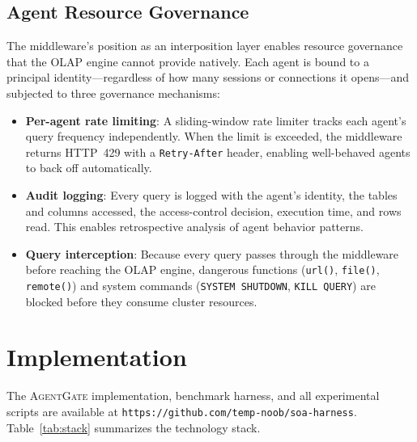 \documentclass[sigconf, nonacm]{acmart}
\newcommand{\sysname}{\textsc{AgentGate}\xspace}  %
\begin{document}
\subsection{Agent Resource Governance}
\label{sec:governance}

The middleware's position as an interposition layer enables resource governance
that the OLAP engine cannot provide natively.  Each agent is bound to a
principal identity---regardless of how many sessions or connections it
opens---and subjected to three governance mechanisms:

\begin{itemize}[leftmargin=*]
  \item \textbf{Per-agent rate limiting}: A sliding-window rate limiter
        tracks each agent's query frequency independently.  When the limit
        is exceeded, the middleware returns HTTP~429 with a
        \texttt{Retry-After} header, enabling well-behaved agents to back
        off automatically.
  \item \textbf{Audit logging}: Every query is logged with the agent's
        identity, the tables and columns accessed, the access-control
        decision, execution time, and rows read.  This enables
        retrospective analysis of agent behavior patterns.
  \item \textbf{Query interception}: Because every query passes through
        the middleware before reaching the OLAP engine, dangerous functions
        (\texttt{url()}, \texttt{file()}, \texttt{remote()}) and system
        commands (\texttt{SYSTEM SHUTDOWN}, \texttt{KILL QUERY}) are
        blocked before they consume cluster resources.
\end{itemize}


\section{Implementation}
\label{sec:implementation}

The \sysname implementation, benchmark harness, and all experimental scripts
are available at
\texttt{https://github.com/temp-noob/soa-harness}.
Table~\ref{tab:stack} summarizes the technology stack.
\end{document}
